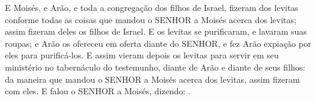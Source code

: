 {  E Moisés, e Arão, e toda a congregação dos filhos de Israel, fizeram dos levitas conforme todas as coisas que mandou o SENHOR a Moisés acerca dos levitas; assim fizeram deles os filhos de Israel.
  E os levitas se purificaram, e lavaram suas roupas; e Arão os ofereceu em oferta diante do SENHOR, e fez Arão expiação por eles para purificá-los.
  E assim vieram depois os levitas para servir em seu ministério no tabernáculo do testemunho, diante de Arão e diante de seus filhos: da maneira que mandou o SENHOR a Moisés acerca dos levitas, assim fizeram com eles.
  E falou o SENHOR a Moisés, dizendo:
  .
\par }

